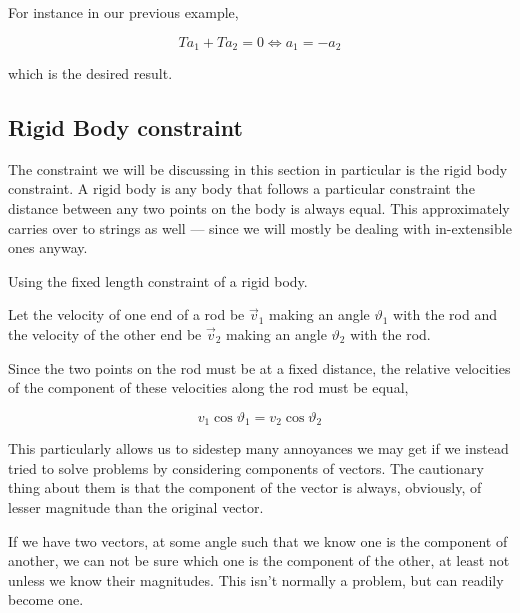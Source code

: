 For instance in our previous example,

\begin{equation*}
    Ta_1 + Ta_2 = 0 \iff a_1 = -a_2
\end{equation*}

which is the desired result.

\subsection{Rigid Body constraint}

The constraint we will be discussing in this section in particular is the rigid body constraint.
A rigid body is any body that follows a particular constraint the distance between
any two points on the body is always equal. This approximately carries over to 
strings as well --- since we will mostly be dealing with in-extensible ones anyway.

\begin{marginfigure}
    \caption{Using the fixed length constraint of a rigid body.}
\end{marginfigure}

Let the velocity of one end of a rod be \(\vec{v}_1\) making an angle \(\vartheta_1\) with the rod
and the velocity of the other end be \(\vec{v}_2\) making an angle \(\vartheta_2\) with the rod.

Since the two points on the rod must be at a fixed distance, the relative velocities of the
 component of these velocities along the rod must be equal,

 \begin{equation}
    \boxed{v_1\cos\vartheta_1 = v_2\cos\vartheta_2}
 \end{equation}

This particularly allows us to sidestep many annoyances we may get if we 
instead tried to solve problems by considering components of vectors. The cautionary thing 
about them is that the component of the vector is always, obviously, of lesser magnitude than 
the original vector.

If we have two vectors, at some angle such that we know one is the component of another, we
can not be sure which one is the component of the other, at least not unless we 
know their magnitudes. This isn't normally a problem, but can readily become one.

\begin{marginfigure}
    \caption{}
    \label{fig: velconstraintex}
\end{marginfigure}


